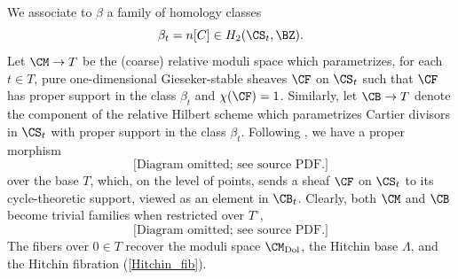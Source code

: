 We associate to $\beta$ a family of homology classes
\[
\beta_t = n[C] \in H_2(\CS_t, \BZ).
\]
Let $\CM \rightarrow T$ be the (coarse) relative moduli space which parametrizes, for each $t \in T$, pure one-dimensional Gieseker-stable sheaves $\CF$ on $\CS_t$ such that $\CF$ has proper support in the class $\beta_t$ and $\chi(\CF)=1$. Similarly, let $\CB \rightarrow T$ denote the component of the relative Hilbert scheme which parametrizes Cartier divisors in $\CS_t$ with proper support in the class $\beta_t$.  Following \cite[Section 5.3]{GIT}, we have a proper morphism
\begin{equation*}
\text{[Diagram omitted; see source PDF.]}
\end{equation*}
over the base $T$, which, on the level of points, sends a sheaf $\CF$ on $\CS_t$ to its cycle-theoretic support, viewed as an element in $\CB_t$.
Clearly, both $\CM$ and $\CB$ become trivial families when restricted over $T^\circ$,
\begin{equation*}
\text{[Diagram omitted; see source PDF.]}
\end{equation*}
The fibers over $0 \in T$ recover the moduli space $\CM_{\mathrm{Dol}}$, the Hitchin base $\Lambda$, and the Hitchin fibration (\ref{Hitchin_fib}).

